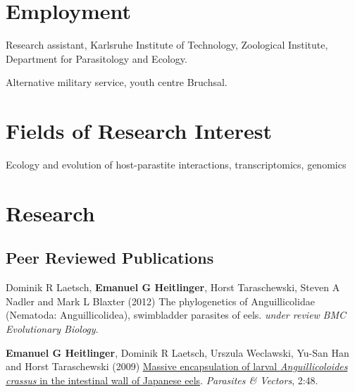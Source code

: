 \documentclass[10pt,letterpaper]{article}
\renewenvironment{itemize}{
  \begin{list}{}{
    \setlength{\leftmargin}{1.5em}
    \setlength{\itemsep}{0.25em}
    \setlength{\parskip}{0pt}
    \setlength{\parsep}{0.25em}
  }
}{
  \end{list}
}
\begin{document}
\section*{Employment}

\begin{itemize}
\item [2008-2011] Research assistant, Karlsruhe Institute of
  Technology, Zoological Institute, Department for Parasitology and
  Ecology.
\item [2000-2001] Alternative military service, youth centre Bruchsal.
\end{itemize}

%

\section*{Fields of Research Interest}

Ecology and evolution of host-parastite interactions, transcriptomics, genomics

\section*{Research}

\subsection*{Peer Reviewed Publications}

\begin{itemize}
\item Dominik R Laetsch, \textbf{Emanuel G Heitlinger}, Horst
  Taraschewski, Steven A Nadler and Mark L Blaxter (2012) The
  phylogenetics of Anguillicolidae (Nematoda: Anguillicolidea),
  swimbladder parasites of eels. \textit{under review} \textit{BMC
    Evolutionary Biology}.
\item \textbf{Emanuel G Heitlinger}, Dominik R Laetsch, Urszula
  Weclawski, Yu-San Han and Horst Taraschewski (2009)
  \href{http://www.parasitesandvectors.com/content/2/1/48}{Massive
    encapsulation of larval \textit{Anguillicoloides crassus} in the
    intestinal wall of Japanese eels}. \textit{Parasites \& Vectors},
  2:48.
\end{itemize}
\end{document}
